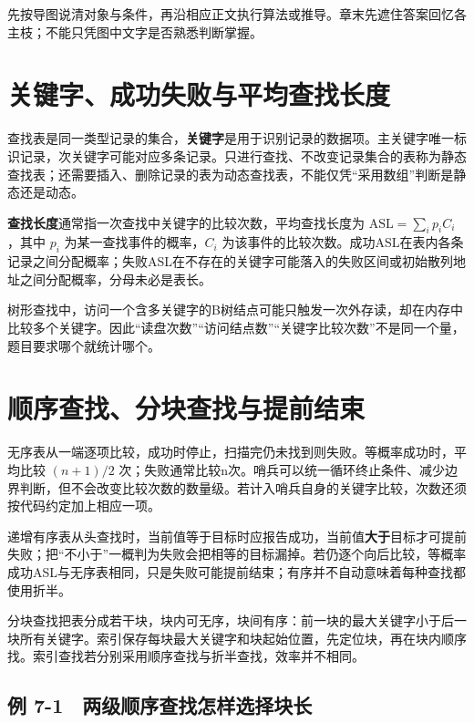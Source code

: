 先按导图说清对象与条件，再沿相应正文执行算法或推导。章末先遮住答案回忆各主枝；不能只凭图中文字是否熟悉判断掌握。

\section{关键字、成功失败与平均查找长度}\label{DS07-01}

\begin{definition}

查找表是同一类型记录的集合，\textbf{关键字}是用于识别记录的数据项。主关键字唯一标识记录，次关键字可能对应多条记录。只进行查找、不改变记录集合的表称为静态查找表；还需要插入、删除记录的表为动态查找表，不能仅凭``采用数组''判断是静态还是动态。

\end{definition}

\textbf{查找长度}通常指一次查找中关键字的比较次数，平均查找长度为 \(\mathrm{ASL}=\sum_i p_iC_i\)，其中 \(p_i\) 为某一查找事件的概率，\(C_i\) 为该事件的比较次数。成功ASL在表内各条记录之间分配概率；失败ASL在不存在的关键字可能落入的失败区间或初始散列地址之间分配概率，分母未必是表长。

树形查找中，访问一个含多关键字的B树结点可能只触发一次外存读，却在内存中比较多个关键字。因此``读盘次数''``访问结点数''``关键字比较次数''不是同一个量，题目要求哪个就统计哪个。

\section{顺序查找、分块查找与提前结束}\label{DS07-02}

无序表从一端逐项比较，成功时停止，扫描完仍未找到则失败。等概率成功时，平均比较 \((n+1)/2\) 次；失败通常比较n次。哨兵可以统一循环终止条件、减少边界判断，但不会改变比较次数的数量级。若计入哨兵自身的关键字比较，次数还须按代码约定加上相应一项。

递增有序表从头查找时，当前值等于目标时应报告成功，当前值\textbf{大于}目标才可提前失败；把``不小于''一概判为失败会把相等的目标漏掉。若仍逐个向后比较，等概率成功ASL与无序表相同，只是失败可能提前结束；有序并不自动意味着每种查找都使用折半。

分块查找把表分成若干块，块内可无序，块间有序：前一块的最大关键字小于后一块所有关键字。索引保存每块最大关键字和块起始位置，先定位块，再在块内顺序找。索引查找若分别采用顺序查找与折半查找，效率并不相同。

\subsection{例 7-1　两级顺序查找怎样选择块长}\label{DS07-ex1}

